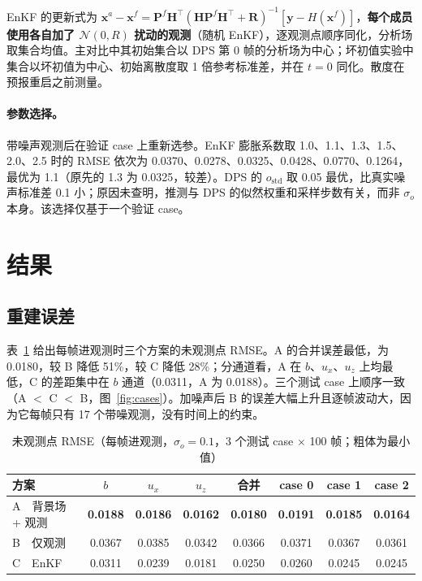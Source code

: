 \documentclass[10.5pt,a4paper]{article}
\newcommand{\bv}[1]{\textbf{#1}}
\begin{document}
EnKF 的更新式为 $\mathbf x^a-\mathbf x^f=\mathbf P^f\mathbf H^{\!\top}(\mathbf H\mathbf P^f\mathbf H^{\!\top}+\mathbf R)^{-1}[\mathbf y-H(\mathbf x^f)]$，\textbf{每个成员使用各自加了 $\mathcal N(0,R)$ 扰动的观测}（随机 EnKF），逐观测点顺序同化，分析场取集合均值。主对比中其初始集合以 DPS 第 0 帧的分析场为中心；坏初值实验中集合以坏初值为中心、初始离散度取 1 倍参考标准差，并在 $t=0$ 同化。散度在预报重启之前测量。

\paragraph{参数选择。}带噪声观测后在验证 case 上重新选参。EnKF 膨胀系数取 1.0、1.1、1.3、1.5、2.0、2.5 时的 RMSE 依次为 0.0370、0.0278、0.0325、0.0428、0.0770、0.1264，最优为 1.1（原先的 1.3 为 0.0325，较差）。DPS 的 $o_\mathrm{std}$ 取 0.05 最优，比真实噪声标准差 0.1 小；原因未查明，推测与 DPS 的似然权重和采样步数有关，而非 $\sigma_o$ 本身。该选择仅基于一个验证 case。

\section{结果}
\subsection{重建误差}
表~\ref{tab:res} 给出每帧进观测时三个方案的未观测点 RMSE。A 的合并误差最低，为 0.0180，较 B 降低 51\%，较 C 降低 28\%；分通道看，A 在 $b$、$u_x$、$u_z$ 上均最低，C 的差距集中在 $b$ 通道（0.0311，A 为 0.0188）。三个测试 case 上顺序一致（A $<$ C $<$ B，图~\ref{fig:cases}）。加噪声后 B 的误差大幅上升且逐帧波动大，因为它每帧只有 17 个带噪观测，没有时间上的约束。

\begin{table}[htbp]\centering\small\caption{未观测点 RMSE（每帧进观测，$\sigma_o=0.1$，3 个测试 case $\times$ 100 帧；粗体为最小值）}\label{tab:res}
\begin{tabular}{@{}lccccccc@{}}\toprule
方案 & $b$ & $u_x$ & $u_z$ & 合并 & case 0 & case 1 & case 2 \\ \midrule
A\ \ 背景场 + 观测 & \bv{0.0188} & \bv{0.0186} & \bv{0.0162} & \bv{0.0180} & \bv{0.0191} & \bv{0.0185} & \bv{0.0164} \\
B\ \ 仅观测 & 0.0367 & 0.0385 & 0.0342 & 0.0366 & 0.0371 & 0.0367 & 0.0361 \\
C\ \ EnKF & 0.0311 & 0.0239 & 0.0181 & 0.0250 & 0.0260 & 0.0245 & 0.0245 \\ \bottomrule\end{tabular}\end{table}
\end{document}
